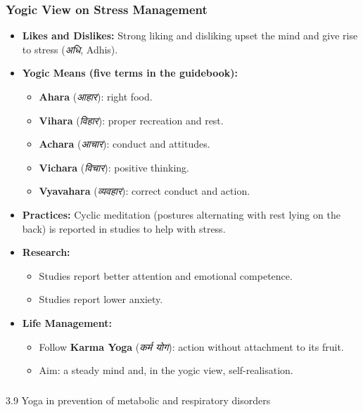 \begin{frame}[fragile]\frametitle{Yogic View on Stress Management}

    \begin{itemize}
        \item \textbf{Likes and Dislikes:} 
        Strong liking and disliking upset the mind and give rise to stress (\textit{अधि}, Adhis).
        \item \textbf{Yogic Means (five terms in the guidebook):}
        \begin{itemize}
            \item \textbf{Ahara} (\textit{आहार}): right food.
            \item \textbf{Vihara} (\textit{विहार}): proper recreation and rest.
            \item \textbf{Achara} (\textit{आचार}): conduct and attitudes.
            \item \textbf{Vichara} (\textit{विचार}): positive thinking.
            \item \textbf{Vyavahara} (\textit{व्यवहार}): correct conduct and action.
        \end{itemize}
        \item \textbf{Practices:}
        Cyclic meditation (postures alternating with rest lying on the back) is reported in studies to help with stress.
        \item \textbf{Research:}
        \begin{itemize}
            \item Studies report better attention and emotional competence.
            \item Studies report lower anxiety.
        \end{itemize}
        \item \textbf{Life Management:}
        \begin{itemize}
            \item Follow \textbf{Karma Yoga} (\textit{कर्म योग}): action without attachment to its fruit.
            \item Aim: a steady mind and, in the yogic view, self-realisation.
        \end{itemize}
    \end{itemize}

\end{frame}


\begin{frame}[fragile]\frametitle{}
\begin{center}
{\Large 3.9 Yoga in prevention of metabolic and respiratory disorders}
\end{center}
\end{frame}

